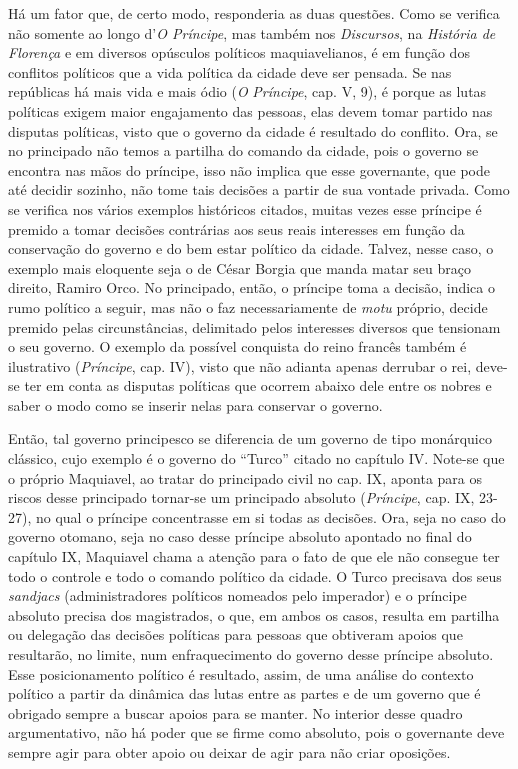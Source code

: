 Há um fator que, de certo modo, responderia as duas questões. Como se
verifica não somente ao longo d'\emph{O Príncipe}, mas também nos
\emph{Discursos}, na \emph{História de Florença} e em diversos opúsculos
políticos maquiavelianos, é em função dos conflitos políticos que a vida
política da cidade deve ser pensada. Se nas repúblicas há mais vida e
mais ódio (\emph{O} \emph{Príncipe}, cap. V, 9), é porque as lutas
políticas exigem maior engajamento das pessoas, elas devem tomar partido
nas disputas políticas, visto que o governo da cidade é resultado do
conflito. Ora, se no principado não temos a partilha do comando da
cidade, pois o governo se encontra nas mãos do príncipe, isso não
implica que esse governante, que pode até decidir sozinho, não tome tais
decisões a partir de sua vontade privada. Como se verifica nos vários
exemplos históricos citados, muitas vezes esse príncipe é premido a
tomar decisões contrárias aos seus reais interesses em função da
conservação do governo e do bem estar político da cidade. Talvez, nesse
caso, o exemplo mais eloquente seja o de César Borgia que manda matar
seu braço direito, Ramiro Orco. No principado, então, o príncipe toma a
decisão, indica o rumo político a seguir, mas não o faz necessariamente
de \emph{motu} próprio, decide premido pelas circunstâncias, delimitado
pelos interesses diversos que tensionam o seu governo. O exemplo da
possível conquista do reino francês também é ilustrativo
(\emph{Príncipe}, cap. IV), visto que não adianta apenas derrubar o rei,
deve-se ter em conta as disputas políticas que ocorrem abaixo dele entre
os nobres e saber o modo como se inserir nelas para conservar o governo.

Então, tal governo principesco se diferencia de um governo de tipo
monárquico clássico, cujo exemplo é o governo do ``Turco'' citado no
capítulo IV. Note-se que o próprio Maquiavel, ao tratar do principado
civil no cap. IX, aponta para os riscos desse principado tornar-se um
principado absoluto (\emph{Príncipe}, cap. IX, 23-27), no qual o
príncipe concentrasse em si todas as decisões. Ora, seja no caso do
governo otomano, seja no caso desse príncipe absoluto apontado no final
do capítulo IX, Maquiavel chama a atenção para o fato de que ele não
consegue ter todo o controle e todo o comando político da cidade. O
Turco precisava dos seus \emph{sandjacs} (administradores políticos
nomeados pelo imperador) e o príncipe absoluto precisa dos magistrados,
o que, em ambos os casos, resulta em partilha ou delegação das decisões
políticas para pessoas que obtiveram apoios que resultarão, no limite,
num enfraquecimento do governo desse príncipe absoluto. Esse
posicionamento político é resultado, assim, de uma análise do contexto
político a partir da dinâmica das lutas entre as partes e de um governo
que é obrigado sempre a buscar apoios para se manter. No interior desse
quadro argumentativo, não há poder que se firme como absoluto, pois o
governante deve sempre agir para obter apoio ou deixar de agir para não
criar oposições.


